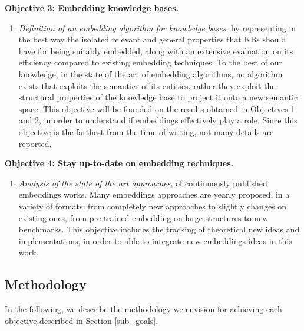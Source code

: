 \noindent\textbf{Objective 3: Embedding knowledge bases.}
\begin{enumerate}
    \item \textit{Definition of an embedding algorithm for knowledge bases}, by representing in the best way the isolated relevant and general properties that KBs should have for being suitably embedded, along with an extensive evaluation on its efficiency compared to existing embedding techniques. To the best of our knowledge, in the state of the art of embedding algorithms, no algorithm exists that exploits the semantics of its entities, rather they exploit the structural properties of the knowledge base to project it onto a new semantic space. This objective will be founded on the results obtained in Objectives 1 and 2, in order to understand if embeddings effectively play a role. Since this objective is the farthest from the time of writing, not many details are reported.
\end{enumerate}

\noindent\textbf{Objective 4: Stay up-to-date on embedding techniques.}
\begin{enumerate}
    \item \textit{Analysis of the state of the art approaches}, of continuously published embeddings works. Many embeddings approaches are yearly proposed, in a variety of formats: from completely new approaches to slightly changes on existing ones, from pre-trained embedding on large structures to new benchmarks. This objective includes the tracking of theoretical new ideas and implementations, in order to able to integrate new embeddings ideas in this work.
\end{enumerate}


\subsection{Methodology}\label{sub_methodology}
In the following, we describe the methodology we envision for achieving each objective described in Section \ref{sub_goals}.

